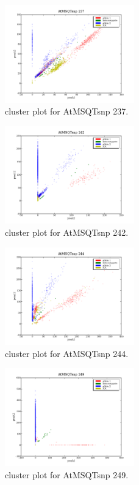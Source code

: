 \begin{figure}[H]
\includegraphics[width=0.5\textwidth]{figures/cluster_plot_AtMSQTsnp_237.png}
\caption{cluster plot for AtMSQTsnp 237.} \label{flAtMSQTsnp237}
\end{figure}
\begin{figure}[H]
\includegraphics[width=0.5\textwidth]{figures/cluster_plot_AtMSQTsnp_242.png}
\caption{cluster plot for AtMSQTsnp 242.} \label{flAtMSQTsnp242}
\end{figure}
\begin{figure}[H]
\includegraphics[width=0.5\textwidth]{figures/cluster_plot_AtMSQTsnp_244.png}
\caption{cluster plot for AtMSQTsnp 244.} \label{flAtMSQTsnp244}
\end{figure}
\begin{figure}[H]
\includegraphics[width=0.5\textwidth]{figures/cluster_plot_AtMSQTsnp_249.png}
\caption{cluster plot for AtMSQTsnp 249.} \label{flAtMSQTsnp249}
\end{figure}
